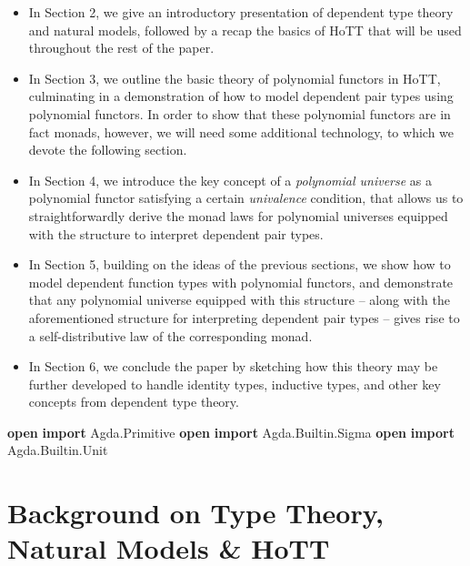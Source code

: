 \documentclass[
  11pt,
  oneside,
  article]{memoir}
\newenvironment{Shaded}{}{}
\newcommand{\KeywordTok}[1]{\textcolor[rgb]{0.00,0.44,0.13}{\textbf{#1}}}
\newcommand{\NormalTok}[1]{#1}
\newcommand{\OtherTok}[1]{\textcolor[rgb]{0.00,0.44,0.13}{#1}}
\providecommand{\tightlist}{%
  \setlength{\itemsep}{0pt}\setlength{\parskip}{0pt}}
\theoremstyle{definition}
\theoremstyle{plain}
\newcommand{\0}{\textsf{0}}
\newcommand{\1}{\tn{\textsf{1}}}
\begin{document}
\begin{itemize}
\tightlist
\item
  In Section 2, we give an introductory presentation of dependent type
  theory and natural models, followed by a recap the basics of HoTT that
  will be used throughout the rest of the paper.
\item
  In Section 3, we outline the basic theory of polynomial functors in
  HoTT, culminating in a demonstration of how to model dependent pair
  types using polynomial functors. In order to show that these
  polynomial functors are in fact monads, however, we will need some
  additional technology, to which we devote the following section.
\item
  In Section 4, we introduce the key concept of a \emph{polynomial
  universe} as a polynomial functor satisfying a certain
  \emph{univalence} condition, that allows us to straightforwardly
  derive the monad laws for polynomial universes equipped with the
  structure to interpret dependent pair types.
\item
  In Section 5, building on the ideas of the previous sections, we show
  how to model dependent function types with polynomial functors, and
  demonstrate that any polynomial universe equipped with this structure
  -- along with the aforementioned structure for interpreting dependent
  pair types -- gives rise to a self-distributive law of the
  corresponding monad.
\item
  In Section 6, we conclude the paper by sketching how this theory may
  be further developed to handle identity types, inductive types, and
  other key concepts from dependent type theory.
\end{itemize}

\begin{Shaded}
\begin{Highlighting}[]
\KeywordTok{open} \KeywordTok{import}\NormalTok{ Agda}\OtherTok{.}\NormalTok{Primitive}
\KeywordTok{open} \KeywordTok{import}\NormalTok{ Agda}\OtherTok{.}\NormalTok{Builtin}\OtherTok{.}\NormalTok{Sigma}
\KeywordTok{open} \KeywordTok{import}\NormalTok{ Agda}\OtherTok{.}\NormalTok{Builtin}\OtherTok{.}\NormalTok{Unit}
\end{Highlighting}
\end{Shaded}

\chapter{Background on Type Theory, Natural Models \&
HoTT}\label{background-on-type-theory-natural-models-hott}
\end{document}
